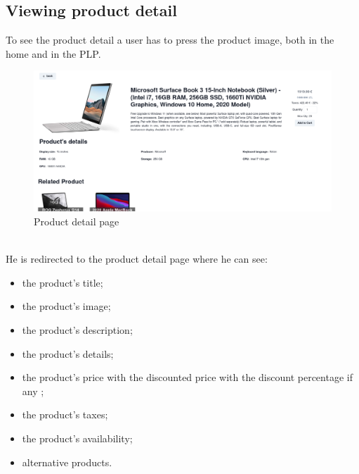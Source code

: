 \subsection{Viewing product detail}
To see the product detail a user has to press the product image, both in the home and in the PLP.
\begin{figure}[!ht]
    \caption{Product detail page}
    \vspace{10px}
    \includegraphics[scale=0.2]{../../../../Images/userManual/PDP.png}
    \centering
\end{figure}
\\
He is redirected to the product detail page where he can see:
\begin{itemize}
    \item the product's title;
    \item the product's image;
    \item the product's description;
    \item the product's details;
    \item the product's price with the discounted price with the discount percentage if any ;
    \item the product's taxes;
    \item the product's availability;
    \item alternative products.
\end{itemize}
\newpage
